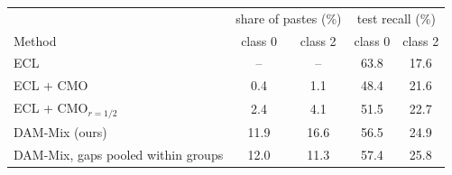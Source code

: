 \begin{tabular}{l cc cc}
\toprule
 & \multicolumn{2}{c}{share of pastes (\%)} & \multicolumn{2}{c}{test recall (\%)} \\
Method & class 0 & class 2 & class 0 & class 2 \\
\midrule
ECL & -- & -- & 63.8 & 17.6 \\
ECL + CMO & 0.4 & 1.1 & 48.4 & 21.6 \\
ECL + CMO$_{r=1/2}$ & 2.4 & 4.1 & 51.5 & 22.7 \\
DAM-Mix (ours) & 11.9 & 16.6 & 56.5 & 24.9 \\
DAM-Mix, gaps pooled within groups & 12.0 & 11.3 & 57.4 & 25.8 \\
\bottomrule
\end{tabular}
